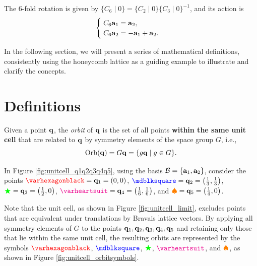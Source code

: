 The 6-fold rotation is given by $\{C_6 \mid 0\} = \{C_2 \mid 0\} \{C_3 \mid 0\}^{-1}$, and its action is
\begin{equation} \label{eq:C6_rotation_P6mm}
\begin{cases}
\; C_6 {\vb{a}}_1 = {\vb{a}}_2, \\
\; C_6 {\vb{a}}_2 = -{\vb{a}}_1 + {\vb{a}}_2.
\end{cases}
\end{equation}

In the following section, we will present a series of mathematical definitions, consistently using the honeycomb lattice as a guiding example to illustrate and clarify the concepts.

\section{Definitions}


\begin{definition} \label{def:orbit_q}
Given a point \({\vb{q}}\), the \textit{orbit} of \({\vb{q}}\) is the set of all points \textbf{within the same unit cell} that are related to \({\vb{q}}\) by symmetry elements of the space group \(G\), i.e.,
\begin{equation} \label{eq:orbit_of_q}
\text{Orb}({\vb{q}}) = G {\vb{q}} = \{g {\vb{q}} \mid g \in G\}.
\end{equation}
\end{definition}

\begin{example} \label{ex:orbit_1a2b3c}
In Figure \ref{fig:unitcell_q1q2q3q4q5}, using the basis $\mathcal{B} = \{{\vb{a}}_1, {\vb{a}}_2\}$, consider the points \(\textcolor{red}{\varhexagonblack} = \q_1 = (0,0)\), \(\textcolor{blue}{\mdblksquare} = \q_2 = \qty(\frac{1}{3}, \frac{1}{3})\), \(\textcolor{green}{\bigstar} = {\vb{q}}_3 = \qty(\frac{1}{2}, 0)\), \(\textcolor{magenta}{\varheartsuit} = \q_4 = \qty(\frac{1}{6}, \frac{1}{6})\), and \(\textcolor{orange}{\spadesuit} = {\vb{q}}_5 = \qty(\frac{1}{4}, 0)\).

Note that the unit cell, as shown in Figure \ref{fig:unitcell_limit}, excludes points that are equivalent under translations by Bravais lattice vectors. By applying all symmetry elements of \(G\) to the points \({\vb{q}}_1, {\vb{q}}_2, {\vb{q}}_3, {\vb{q}}_4, {\vb{q}}_5\) and retaining only those that lie within the same unit cell, the resulting orbits are represented by the symbols \(\textcolor{red}{\varhexagonblack}\), \(\textcolor{blue}{\mdblksquare}\), \(\textcolor{green}{\bigstar}\), \(\textcolor{magenta}{\varheartsuit}\), and \(\textcolor{orange}{\spadesuit}\), as shown in Figure \ref{fig:unitcell_orbitsymbols}.
\end{example}

